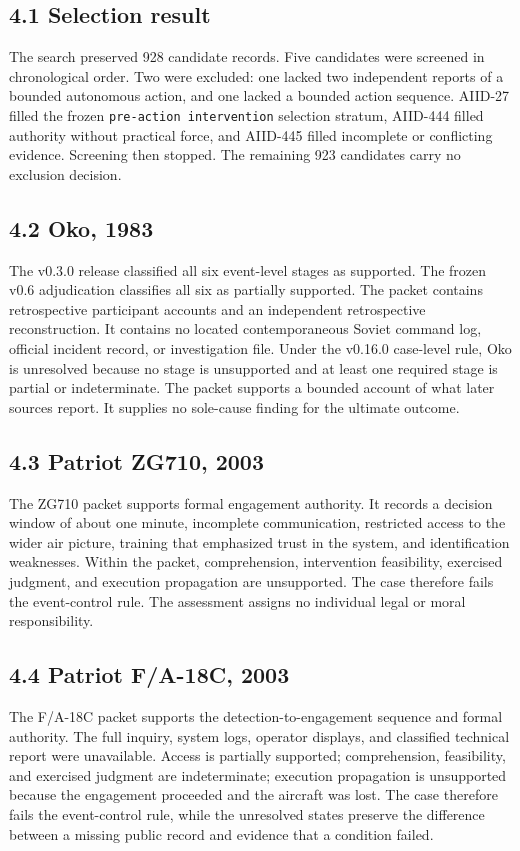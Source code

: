 \documentclass[11pt]{article}
\begin{document}
\subsection*{4.1 Selection result}
The search preserved 928 candidate records. Five candidates were screened in chronological order. Two were excluded: one lacked two independent reports of a bounded autonomous action, and one lacked a bounded action sequence. AIID-27 filled the frozen \texttt{pre-action intervention} selection stratum, AIID-444 filled authority without practical force, and AIID-445 filled incomplete or conflicting evidence. Screening then stopped. The remaining 923 candidates carry no exclusion decision.
\subsection*{4.2 Oko, 1983}
The v0.3.0 release classified all six event-level stages as supported. The frozen v0.6 adjudication classifies all six as partially supported. The packet contains retrospective participant accounts and an independent retrospective reconstruction. It contains no located contemporaneous Soviet command log, official incident record, or investigation file. Under the v0.16.0 case-level rule, Oko is unresolved because no stage is unsupported and at least one required stage is partial or indeterminate. The packet supports a bounded account of what later sources report. It supplies no sole-cause finding for the ultimate outcome.
\subsection*{4.3 Patriot ZG710, 2003}
The ZG710 packet supports formal engagement authority. It records a decision window of about one minute, incomplete communication, restricted access to the wider air picture, training that emphasized trust in the system, and identification weaknesses. Within the packet, comprehension, intervention feasibility, exercised judgment, and execution propagation are unsupported. The case therefore fails the event-control rule. The assessment assigns no individual legal or moral responsibility.
\subsection*{4.4 Patriot F/A-18C, 2003}
The F/A-18C packet supports the detection-to-engagement sequence and formal authority. The full inquiry, system logs, operator displays, and classified technical report were unavailable. Access is partially supported; comprehension, feasibility, and exercised judgment are indeterminate; execution propagation is unsupported because the engagement proceeded and the aircraft was lost. The case therefore fails the event-control rule, while the unresolved states preserve the difference between a missing public record and evidence that a condition failed.
\end{document}
